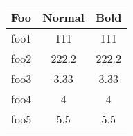 

\begin{table}[!htb]
    \centering
    \caption{}
    \label{}
    \begin{tabular}{@{}lS[table-format=3.2] S[table-format=3.2]@{}}
        \toprule
        Foo & \textbf{Normal} & \textbf{Bold} \\
        \midrule
        foo1 & 111 & 111 \\
        foo2 & 222.2 & 222.2 \\
        foo3 & 3.33 & 3.33 \\
        foo4 & 4 & 4 \\
        foo5 & 5.5 & 5.5 \\
        \bottomrule
    \end{tabular}
\end{table}
